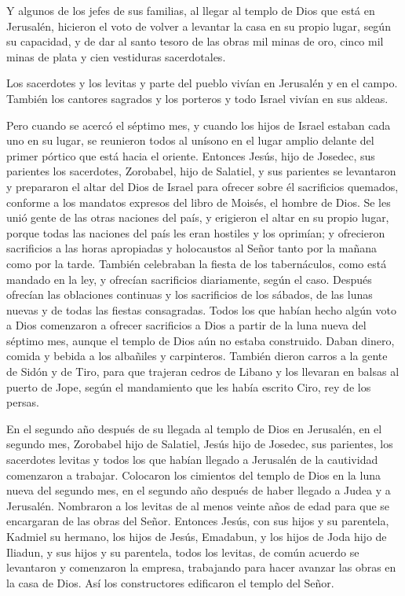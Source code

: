  Y algunos de los jefes de sus familias, al llegar al
templo de Dios que está en Jerusalén, hicieron el voto de volver a
levantar la casa en su propio lugar, según su capacidad, 
y de dar al santo tesoro de las obras mil minas de oro, cinco mil minas
de plata y cien vestiduras sacerdotales.

 Los sacerdotes y los levitas y parte del pueblo vivían
en Jerusalén y en el campo. También los cantores sagrados y los porteros
y todo Israel vivían en sus aldeas.

 Pero cuando se acercó el séptimo mes, y cuando los hijos
de Israel estaban cada uno en su lugar, se reunieron todos al unísono en
el lugar amplio delante del primer pórtico que está hacia el oriente.
 Entonces Jesús, hijo de Josedec, sus parientes los
sacerdotes, Zorobabel, hijo de Salatiel, y sus parientes se levantaron y
prepararon el altar del Dios de Israel  para ofrecer
sobre él sacrificios quemados, conforme a los mandatos expresos del
libro de Moisés, el hombre de Dios.  Se les unió gente de
las otras naciones del país, y erigieron el altar en su propio lugar,
porque todas las naciones del país les eran hostiles y los oprimían; y
ofrecieron sacrificios a las horas apropiadas y holocaustos al Señor
tanto por la mañana como por la tarde.  También
celebraban la fiesta de los tabernáculos, como está mandado en la ley, y
ofrecían sacrificios diariamente, según el caso.  Después
ofrecían las oblaciones continuas y los sacrificios de los sábados, de
las lunas nuevas y de todas las fiestas consagradas. 
Todos los que habían hecho algún voto a Dios comenzaron a ofrecer
sacrificios a Dios a partir de la luna nueva del séptimo mes, aunque el
templo de Dios aún no estaba construido.  Daban dinero,
comida y bebida a los albañiles y carpinteros.  También
dieron carros a la gente de Sidón y de Tiro, para que trajeran cedros de
Libano y los llevaran en balsas al puerto de Jope, según el mandamiento
que les había escrito Ciro, rey de los persas.

 En el segundo año después de su llegada al templo de
Dios en Jerusalén, en el segundo mes, Zorobabel hijo de Salatiel, Jesús
hijo de Josedec, sus parientes, los sacerdotes levitas y todos los que
habían llegado a Jerusalén de la cautividad comenzaron a trabajar.
 Colocaron los cimientos del templo de Dios en la luna
nueva del segundo mes, en el segundo año después de haber llegado a
Judea y a Jerusalén.  Nombraron a los levitas de al menos
veinte años de edad para que se encargaran de las obras del Señor.
Entonces Jesús, con sus hijos y su parentela, Kadmiel su hermano, los
hijos de Jesús, Emadabun, y los hijos de Joda hijo de Iliadun, y sus
hijos y su parentela, todos los levitas, de común acuerdo se levantaron
y comenzaron la empresa, trabajando para hacer avanzar las obras en la
casa de Dios. Así los constructores edificaron el templo del Señor.

